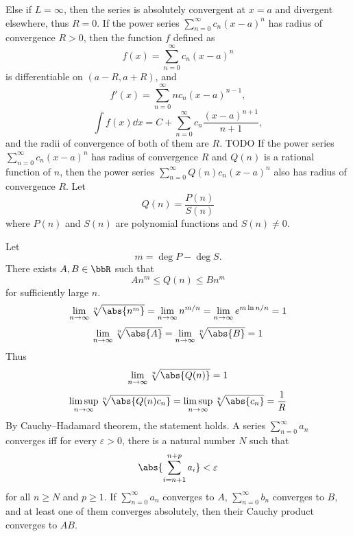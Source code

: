 Else if $L=\infty$, then the series is absolutely convergent at $x=a$ and divergent elsewhere, thus $R=0$.
\epr
{}
If the power series $\sum_{n=0}^{\infty}c_n(x-a)^n$ has radius of convergence $R>0$, then the function $f$ defined as
\[f(x)=\sum_{n=0}^{\infty}c_n(x-a)^n\]
is differentiable on $(a-R,a+R)$, and
\[f'(x)=\sum_{n=0}^{\infty}nc_n(x-a)^{n-1},\]
\[\int f(x)\dd{x}=C+\sum_{n=0}^{\infty}c_n\frac{(x-a)^{n+1}}{n+1},\]
and the radii of convergence of both of them are $R$.
\bpr
TODO
\epr
{}
If the power series $\sum_{n=0}^{\infty}c_n(x-a)^n$ has radius of convergence $R$ and $Q(n)$ is a rational function of $n$, then the power series $\sum_{n=0}^{\infty}Q(n)c_n(x-a)^n$ also has radius of convergence $R$.
\bpr
Let
\[Q(n)=\frac{P(n)}{S(n)}\]
where $P(n)$ and $S(n)$ are polynomial functions and $S(n)\ne0$.

Let
\[m=\deg P-\deg S.\]
There exists $A, B\in\bbR$ such that
\[An^m\le Q(n)\le Bn^m\]
for sufficiently large $n$.
\[\lim_{n\to\infty}\sqrt[n]{\abs{n^m}}=\lim_{n\to\infty}n^{m/n}=\lim_{n\to\infty}e^{m\ln n/n}=1\]
\[\lim_{n\to\infty}\sqrt[n]{\abs{A}}=\lim_{n\to\infty}\sqrt[n]{\abs{B}}=1\]
Thus
\[\lim_{n\to\infty}\sqrt[n]{\abs{Q(n)}}=1\]
\[\limsup_{n\to\infty}\sqrt[n]{\abs{Q(n)c_n}}=\limsup_{n\to\infty}\sqrt[n]{\abs{c_n}}=\frac{1}{R}\]
By Cauchy–Hadamard theorem, the statement holds.
\epr
{}
A series $\sum_{n=0}^{\infty}a_n$ converges iff for every $\varepsilon>0$, there is a natural number $N$ such that
\[\abs{\sum_{i=n+1}^{n+p}a_i}<\varepsilon\]
for all $n\geq N$ and $p\geq 1$.
If $\sum_{n=0}^{\infty}a_n$ converges to $A$, $\sum_{n=0}^{\infty}b_n$ converges to $B$, and at least one of them converges absolutely, then their Cauchy product converges to $AB$.

